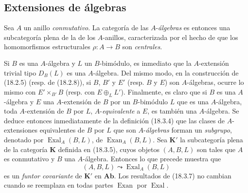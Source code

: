 \subsection{Extensiones de álgebras}
\label{subsection:0.18.4-es}

\begin{env}[18.4.1]
\label{0.18.4.1-es}
Sea $A$ un anillo \emph{conmutativo}. La categoría de las $A$-\emph{álgebras} es
entonces una subcategoría plena de la de los $A$-anillos, caracterizada por el
hecho de que los homomorfismos estructurales $\rho:A\to B$ son \emph{centrales}.

Si $B$ es una $A$-álgebra y $L$ un $B$-bimódulo, es inmediato que la
$A$-extensión trivial tipo $D_B(L)$ es una $A$-álgebra. Del mismo modo, en la
construcción de (18.2.5) (resp. de (18.2.8)), si $B$, $B'$ y $E'$ (resp.
$B$ y $E$) son $A$-álgebras, ocurre lo mismo con
$E'\times_{B'}B$ (resp. con $E\oplus_LL'$). Finalmente, es claro que si $B$ es
una $A$-álgebra y $E$ una $A$-extensión de $B$ por un $B$-bimódulo $L$ que
es una $A$-álgebra, toda $A$-extensión de $B$ por $L$, $A$-\emph{equivalente}
a $E$, es también una $A$-álgebra. Se deduce entonces inmediatamente de la definición
(18.3.4) que las clases de $A$-extensiones equivalentes de $B$ por $L$ que
son $A$-\emph{álgebras} forman un \emph{subgrupo}, denotado por
$\operatorname{Exal}_A(B,L)$, de $\operatorname{Exan}_A(B,L)$. Sea
$\boldsymbol{K}'$ la subcategoría plena de la categoría $\boldsymbol{K}$ definida en
(18.3.5), cuyos objetos $(A,B,L)$ son tales que $A$ es conmutativo y $B$
una $A$-álgebra. Entonces lo que precede muestra que
\[
  (A,B,L)\leadsto\operatorname{Exal}_A(B,L)
\]
es un \emph{funtor covariante} de $\boldsymbol{K}'$ en $\boldsymbol{Ab}$. Los
resultados de (18.3.7) no cambian cuando se reemplaza en todas partes
$\operatorname{Exan}$ por $\operatorname{Exal}$.
\end{env}

